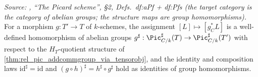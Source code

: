 \begin{lemma}\leanok
  \label{lem:rel_pic_sharp_functorial}

  \textit{Source: \cite{kleiman-picard}, ``The Picard scheme'', \S 2,
  Defs.~df:aPf + df:Pfs (the target category is the category of abelian
  groups; the structure maps are group homomorphisms).}
  For a morphism \(g : T' \to T\) of \(k\)-schemes, the assignment
  \([L] \mapsto [g_C^* L]\) is a well-defined homomorphism of abelian groups
  \(g^\sharp : \Pic^\sharp_{C/k}(T) \to \Pic^\sharp_{C/k}(T')\) with respect
  to the \(H_T\)-quotient structure of
  \cref{thm:rel_pic_addcommgroup_via_tensorobj}, and the identity and
  composition laws \(\mathrm{id}^\sharp = \mathrm{id}\) and
  \((g \circ h)^\sharp = h^\sharp \circ g^\sharp\) hold as identities of group
  homomorphisms.
\end{lemma}

